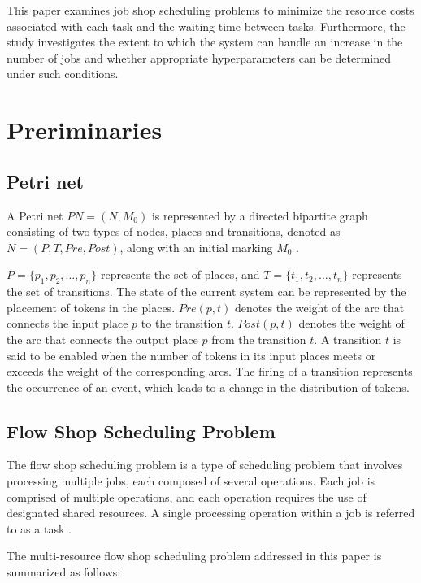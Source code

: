 \documentclass[conference]{IEEEtran}
\begin{document}
This paper examines job shop scheduling problems to minimize the resource costs associated with each task and the waiting time between tasks. Furthermore, the study investigates the extent to which the system can handle an increase in the number of jobs and whether appropriate hyperparameters can be determined under such conditions.

\section{Preriminaries}

\subsection{Petri net}
A Petri net $PN = (N,M_0)$ is represented by a directed bipartite graph consisting of two types of nodes, places and transitions, denoted as $N = (P,T,Pre,Post)$, along with an initial marking $M_0$ \cite{b1}.

$P = \{p_1, p_2, \ldots, p_n\}$ represents the set of places, and $T = \{t_1, t_2, \ldots, t_n\}$ represents the set of transitions. The state of the current system can be represented by the placement of tokens in the places. $Pre(p,t)$ denotes the weight of the arc that connects the input place $p$ to the transition $t$. $Post(p,t)$ denotes the weight of the arc that connects the output place $p$ from the transition $t$. A transition $t$ is said to be enabled when the number of tokens in its input places meets or exceeds the weight of the corresponding arcs. The firing of a transition represents the occurrence of an event, which leads to a change in the distribution of tokens.


\subsection{Flow Shop Scheduling Problem} 
The flow shop scheduling problem is a type of scheduling problem that involves processing multiple jobs, each composed of several operations. 
Each job is comprised of multiple operations, and each operation requires the use of designated shared resources. A single processing operation within a job is referred to as a task \cite{b2}.

The multi-resource flow shop scheduling problem addressed in this paper is summarized as follows:
\end{document}
